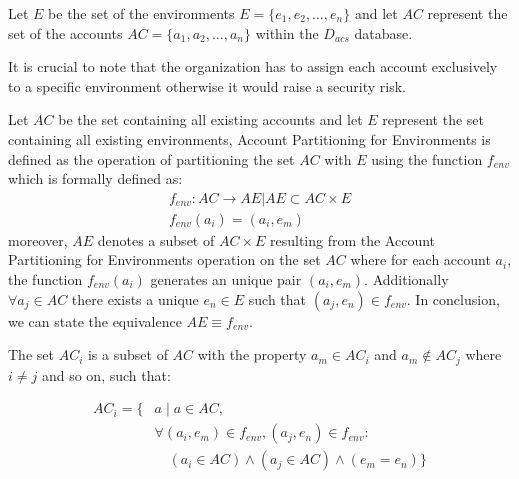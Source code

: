 \vspace{15pt}

Let $E$ be the set of the environments $E = \{e_1, e_2, \ldots, e_n\}$ and let $AC$ represent the set of the accounts $AC = \{a_1, a_2, \ldots, a_n\}$ within the $D_{acs}$ database.

\vspace{15pt}

It is crucial to note that the organization has to assign each account exclusively to a specific environment otherwise it would raise a security risk.

\begin{boxF}
    \begin{definition}
        Let $AC$ be the set containing all existing accounts and let $E$ represent the set containing all existing environments, Account Partitioning for Environments is defined as the operation of partitioning the set $AC$ with $E$ using the function $f_{env}$ which is formally defined as:
        \begin{equation*}
            \begin{gathered}
                f_{env}:AC \rightarrow AE | AE \subset AC \times E\\
                f_{env}(a_i) = (a_i, e_m)
            \end{gathered}
            \label{definition:fenv}
        \end{equation*}
        moreover, $AE$ denotes a subset of $AC \times E$ resulting from the Account Partitioning for Environments operation on the set $AC$ where for each account $a_i$, the function $f_{env}(a_i)$ generates an unique pair $(a_i, e_m)$.
        Additionally $\forall a_j \in AC$ there exists a unique $e_n \in E$ such that $(a_j,e_n) \in f_{env}$.
        In conclusion, we can state the equivalence $AE \equiv f_{env}$.
        \label{definition:environments-partitioning}
    \end{definition}
\end{boxF}

The set $AC_i$ is a subset of $AC$ with the property $a_m \in AC_i$ and $a_m \notin AC_j$ where $i \neq j$ and so on, such that:

\begin{align*}
    AC_i = \{ & a \mid a \in AC, \nonumber \\
    & \forall (a_i, e_m) \in f_{env}, (a_j, e_n) \in f_{env} : \nonumber \\
    & \quad (a_i \in AC) \wedge (a_j \in AC) \wedge (e_m = e_n) \}
\end{align*}

